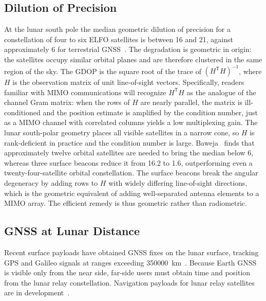 \documentclass[11pt,a4paper]{article}
\begin{document}
\subsection{Dilution of Precision}
At the lunar south pole the median geometric dilution of precision for a constellation of four to six ELFO satellites is between 16 and 21, against approximately 6 for terrestrial GNSS~\cite{baweja_dop}. The degradation is geometric in origin: the satellites occupy similar orbital planes and are therefore clustered in the same region of the sky. The GDOP is the square root of the trace of $(H^{\mathsf{T}}H)^{-1}$, where $H$ is the observation matrix of unit line-of-sight vectors. Specifically, readers familiar with MIMO communications will recognize $H^{\mathsf{T}}H$ as the analogue of the channel Gram matrix: when the rows of $H$ are nearly parallel, the matrix is ill-conditioned and the position estimate is amplified by the condition number, just as a MIMO channel with correlated columns yields a low multiplexing gain. The lunar south-polar geometry places all visible satellites in a narrow cone, so $H$ is rank-deficient in practice and the condition number is large. Baweja~\cite{baweja_dop} finds that approximately twelve orbital satellites are needed to bring the median below 6, whereas three surface beacons reduce it from 16.2 to 1.6, outperforming even a twenty-four-satellite orbital constellation. The surface beacons break the angular degeneracy by adding rows to $H$ with widely differing line-of-sight directions, which is the geometric equivalent of adding well-separated antenna elements to a MIMO array. The efficient remedy is thus geometric rather than radiometric.

\subsection{GNSS at Lunar Distance}
Recent surface payloads have obtained GNSS fixes on the lunar surface, tracking GPS and Galileo signals at ranges exceeding \SI{350000}{km}~\cite{parker_lugre,nasa_lugre}. Because Earth GNSS is visible only from the near side, far-side users must obtain time and position from the lunar relay constellation. Navigation payloads for lunar relay satellites are in development~\cite{nasa_navcube3_2026}.
\end{document}

